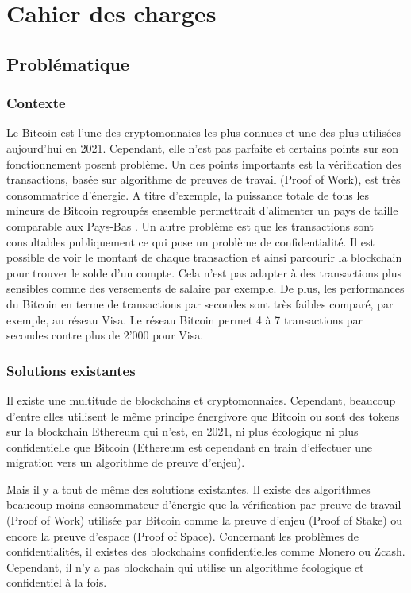 \chapter{Cahier des charges}

\section*{Problématique}

\subsection*{Contexte}

Le Bitcoin est l'une des cryptomonnaies les plus connues et une des plus utilisées aujourd'hui en 2021. Cependant, elle n'est pas parfaite et certains points sur son fonctionnement posent problème. Un des points importants est la vérification des transactions, basée sur algorithme de preuves de travail (Proof of Work), est très consommatrice d'énergie. A titre d'exemple, la puissance totale de tous les mineurs de Bitcoin regroupés ensemble permettrait d'alimenter un pays de taille comparable aux Pays-Bas \cite{BTC_cons}. Un autre problème est que les transactions sont consultables publiquement ce qui pose un problème de confidentialité. Il est possible de voir le montant de chaque transaction et ainsi parcourir la blockchain pour trouver le solde d'un compte. Cela n'est pas adapter à des transactions plus sensibles comme des versements de salaire par exemple. De plus, les performances du Bitcoin en terme de transactions par secondes sont très faibles comparé, par exemple, au réseau Visa. Le réseau Bitcoin permet 4 à 7 transactions par secondes contre plus de 2'000 pour Visa.

\subsection*{Solutions existantes}

Il existe une multitude de blockchains et cryptomonnaies. Cependant, beaucoup d'entre elles utilisent le même principe énergivore que Bitcoin ou sont des tokens sur la blockchain Ethereum qui n'est, en 2021, ni plus écologique ni plus confidentielle que Bitcoin (Ethereum est cependant en train d'effectuer une migration vers un algorithme de preuve d'enjeu).

Mais il y a tout de même des solutions existantes. Il existe des algorithmes beaucoup moins consommateur d'énergie que la vérification par preuve de travail (Proof of Work) utilisée par Bitcoin comme la preuve d'enjeu (Proof of Stake) ou encore la preuve d'espace (Proof of Space). Concernant les problèmes de confidentialités, il existes des blockchains confidentielles comme Monero ou Zcash. Cependant, il n'y a pas blockchain qui utilise un algorithme écologique et confidentiel à la fois.

